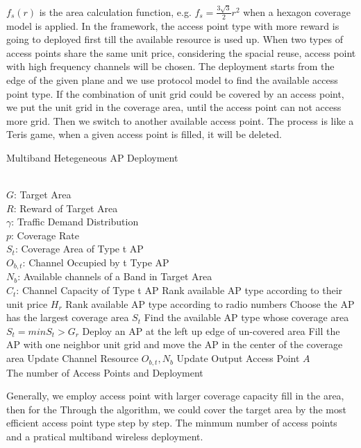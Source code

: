 $f_s(r)$ is the area calculation function, e.g. $f_s = \frac{3\sqrt{3}}{2}r^2$ when a 
hexagon coverage model is applied. In the framework, the access point type with more reward 
is going to deployed first till the available resource is used up. When two types of access points
share the same unit price, considering the spacial reuse, access point with high frequency channels
will be chosen. The deployment starts from the edge of the given plane and we use protocol model
to find the available access point type. If the combination of unit 
grid could be covered by an access point, we put the unit grid in the coverage area, until the access
point can not access more grid. Then we switch to another available access point. The process is like
a Teris game, when a given access point is filled, it will be deleted.
\begin{algorithm}
\caption{Multiband Hetegeneous AP Deployment}
\label{alg:gls}
\begin{algorithmic}[1]
\REQUIRE  ~~\\
$G$: Target Area \\
$R$: Reward of Target Area \\
$\gamma$: Traffic Demand Distribution\\
$p$: Coverage Rate\\
$S_t$: Coverage Area of Type t AP \\
$O_{b,t}$: Channel Occupied by t Type AP\\
$N_b$: Available channels of a Band in Target Area\\
$C_t$: Channel Capacity of Type t AP
\STATE Rank available AP type according to their unit price $H_r$
\STATE Rank available AP type according to radio numbers
\STATE Choose the AP has the largest coverage area $S_t$
\ELSE 
\STATE Find the available AP type whose coverage area $S_t=min{S_t>G_r}$
\ENDIF
\STATE Deploy an AP at the left up edge of un-covered area
\STATE Fill the AP with one neighbor unit grid and move the AP in the center of the coverage area
\STATE Update Channel Resource $O_{b,t}, N_b$
\STATE Update Output Access Point $A$
\ENDWHILE
\ENSURE ~~\\
The number of Access Points and Deployment\\
\end{algorithmic}
\end{algorithm}

Generally, we employ access point with larger coverage capacity fill in the area, then for the 
Through the algorithm, we could cover the target area by the most efficient access point type
step by step. The minmum number of access points and a pratical multiband wireless deployment.
